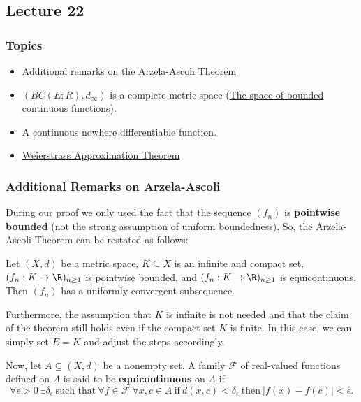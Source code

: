 \subsection{Lecture 22}

\subsubsection{Topics}

\begin{itemize}
    \item {\hyperref[Additional remarks on the Arzela-Ascoli Theorem]{Additional remarks on the Arzela-Ascoli Theorem}} 
    \item  \( (BC(E; R), {d}_{\infty }) \) is a complete metric space ({\hyperref[The space of bounded continuous functions]{The space of bounded continuous functions}}). 
    \item A continuous nowhere differentiable function.
    \item {\hyperref[Weierstrass Approximation Theorem]{Weierstrass Approximation Theorem}}  
\end{itemize}

\subsubsection{Additional Remarks on Arzela-Ascoli}\label{Additional remarks on the Arzela-Ascoli Theorem}

During our proof we only used the fact that the sequence \( ({f}_{n}) \) is \textbf{pointwise bounded} (not the strong assumption of uniform boundedness). So, the Arzela-Ascoli Theorem can be restated as follows:

\begin{theorem}
    Let \( (X,d) \) be a metric space, \( K \subseteq  X   \) is an infinite and compact set, \( ({f}_{n}: K \to \R )_{n \geq 1 } \) is pointwise bounded, and \( ({f}_{n}: K \to \R )_{n \geq 1} \) is equicontinuous. Then \( ({f}_{n}) \) has a uniformly convergent subsequence.
\end{theorem}

Furthermore, the assumption that \( K  \) is infinite is not needed and that the claim of the theorem still holds even if the compact set \( K  \) is finite. In this case, we can simply set \( E = K  \) and adjust the steps accordingly. 

Now, let \( A \subseteq  (X,d)  \) be a nonempty set. A family \( \mathcal{F} \) of real-valued functions defined on \( A  \) is said to be \textbf{equicontinuous} on \( A  \) if 
\[  \forall \epsilon > 0  \ \exists {\delta}_{\epsilon} \ \text{such that} \ \forall f \in \mathcal{F} \ \forall x,c \in A \ \text{if} \ d(x,c) < {\delta}_{\epsilon} \ \text{then} \ | f(x) - f(c) | < \epsilon.   \] 

